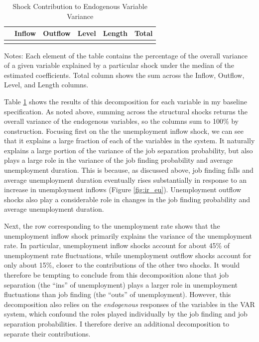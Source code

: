 \documentclass[12pt]{article}
\newcommand{\inputpath}{../output/tables/}
\begin{document}
\begin{table}[t!]
\centering
\caption{Shock Contribution to Endogenous Variable Variance}\label{tab:shock_contribution}
\begin{threeparttable}\small
\begin{tabular}{l | c c c c | c}
\toprule
& Inflow & Outflow & Level & Length & Total \\\hline
& & & & & \\[-0.25cm]

\bottomrule
\end{tabular}
\begin{tablenotes}\footnotesize
Notes: Each element of the table contains the percentage of the overall variance of a given variable explained by a particular shock under the median of the estimated coefficients. Total column shows the sum across the Inflow, Outflow, Level, and Length columns.
\end{tablenotes}
\end{threeparttable}
\end{table}

Table \ref{tab:shock_contribution} shows the results of this decomposition for each variable in my baseline specification. As noted above, summing across the structural shocks returns the overall variance of the endogenous variables, so the columns sum to 100\% by construction. Focusing first on the the unemployment inflow shock, we can see that it explains a large fraction of each of the variables in the system. It naturally explains a large portion of the variance of the job separation probability, but also plays a large role in the variance of the job finding probability and average unemployment duration. This is because, as discussed above, job finding falls and average unemployment duration eventually rises substantially in response to an increase in unemployment inflows (Figure \ref{fig:ir_eu}). Unemployment outflow shocks also play a considerable role in changes in the job finding probability and average unemployment duration.

Next, the row corresponding to the unemployment rate shows that the unemployment inflow shock primarily explains the variance of the unemployment rate. In particular, unemployment inflow shocks account for about 45\% of unemployment rate fluctuations, while unemployment outflow shocks account for only about 15\%, closer to the contributions of the other two shocks. It would therefore be tempting to conclude from this decomposition alone that job separation (the ``ins'' of unemployment) plays a larger role in unemployment fluctuations than job finding (the ``outs'' of unemployment). However, this decomposition also relies on the \textit{endogenous} responses of the variables in the VAR system, which confound the roles played individually by the job finding and job separation probabilities. I therefore derive an additional decomposition to separate their contributions.
\end{document}
